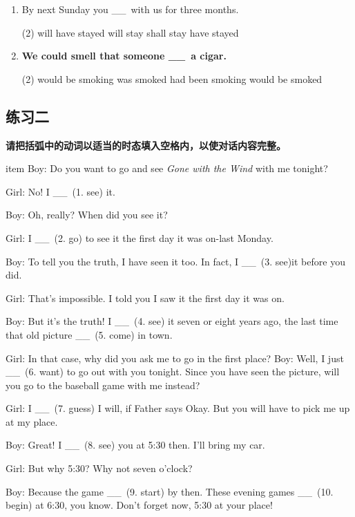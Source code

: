 \documentclass{yufa}
\newcommand\ttu{ \_\_\ }
\begin{document}
\begin{enumerate}
\item By next Sunday you \ttu with us for three months.
  \begin{tasks}(2)
    \task will have stayed
    \task will stay
    \task shall stay
    \task have stayed
  \end{tasks}


\item \textbf{We could smell that someone \ttu a cigar.}
  \begin{tasks}(2)
    \task would be smoking
    \task was smoked
    \task had been smoking
    \task would be smoked
  \end{tasks}

\end{enumerate}

\subsection{练习二}

\textbf{请把括弧中的动词以适当的时态填入空格内，以使对话内容完整。}

item Boy: Do you want to go and see \textit{Gone with the Wind} with me tonight?

Girl: No! I \ttu (1. see) it.

Boy: Oh, really? When did you see it?

Girl: I \ttu (2. go) to see it the first day it was on-last Monday.

Boy: To tell you the truth, I have seen it too. In fact, I \ttu (3. see)it before you did.

Girl: That's impossible. I told you I saw it the first day it was on.

Boy: But it's the truth! I \ttu (4. see) it seven or eight years ago, the
last time that old picture \ttu (5. come) in town.


Girl: In that case, why did you ask me to go in the first place? Boy: Well,
I just \ttu (6. want) to go out with you tonight. Since you have seen the
picture, will you go to the baseball game with me instead?

Girl: I \ttu (7. guess) I will, if Father says Okay. But you will have to
pick me up at my place.

Boy: Great! I \ttu (8. see) you at 5:30 then. I'll bring my car.

Girl: But why 5:30? Why not seven o'clock?

Boy: Because the game \ttu (9. start) by then. These evening games \ttu (10.
begin) at 6:30, you know. Don't forget now, 5:30 at your place!
\end{document}
